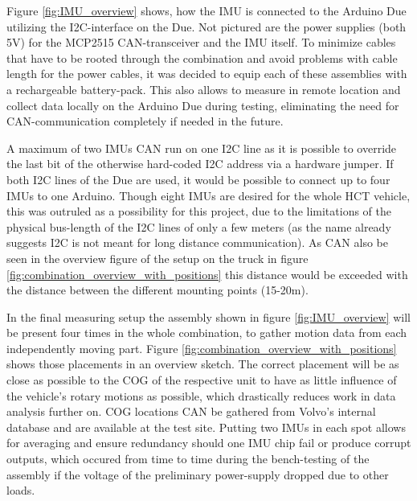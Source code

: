 \documentclass[ExampleMasters.tex]{subfiles}
\begin{document}
Figure \ref{fig:IMU_overview} shows, how the \gls{IMU} is connected to the Arduino Due utilizing the \gls{I2C}-interface on the Due. Not pictured are the power supplies (both 5V) for the MCP2515 \gls{CAN}-transceiver and the \gls{IMU} itself. To minimize cables that have to be rooted through the combination and avoid problems with cable length for the power cables, it was decided to equip each of these assemblies with a rechargeable battery-pack. This also allows to measure in remote location and collect data locally on the Arduino Due during testing, eliminating the need for CAN-communication completely if needed in the future.

A maximum of two \gls{IMU}s \gls{CAN} run on one \gls{I2C} line as it is possible to override the last bit of the otherwise hard-coded \gls{I2C} address via a hardware jumper. If both \gls{I2C} lines of the Due are used, it would be possible to connect up to four IMUs to one Arduino. Though eight \gls{IMU}s are desired for the whole \gls{HCT} vehicle, this was outruled as a possibility for this project, due to the limitations of the physical bus-length of the \gls{I2C} lines of only a few meters (as the name already suggests \gls{I2C} is not meant for long distance communication). As \gls{CAN} also be seen in the overview figure of the setup on the truck in figure \ref{fig:combination_overview_with_positions} this distance would be exceeded with the distance between the different mounting points (15-20m).

In the final measuring setup the assembly shown in figure \ref{fig:IMU_overview} will be present four times in the whole combination, to gather motion data from each independently moving part. Figure \ref{fig:combination_overview_with_positions} shows those placements in an overview sketch. The correct placement will be as close as possible to the \gls{COG} of the respective unit to have as little influence of the vehicle's rotary motions as possible, which drastically reduces work in  data analysis further on. \gls{COG}  locations \gls{CAN} be gathered from Volvo's internal database and are available at the test site. Putting two \gls{IMU}s in each spot allows for averaging and ensure redundancy should one \gls{IMU} chip fail or produce corrupt outputs, which occured from time to time during the bench-testing of the assembly if the voltage of the preliminary power-supply dropped due to other loads.\\
\end{document}
